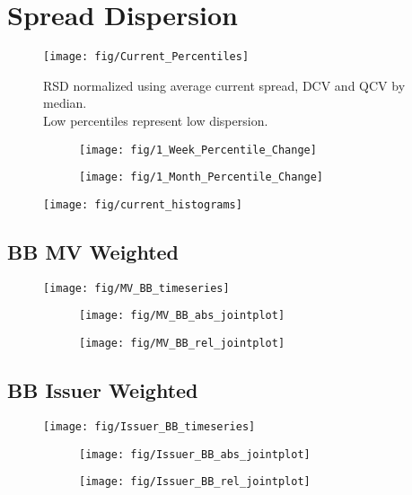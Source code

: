 \documentclass[12pt]{article}
\begin{document}
\section{Spread Dispersion}
\begin{figure}[H]
	\centering
	\texttt{[image: fig/Current\_Percentiles]}
	\caption{RSD normalized using average current spread, DCV and QCV by median.\\ Low percentiles represent low dispersion.}
\end{figure}

\begin{figure}[H]
	\begin{subfigure}[t]{0.48\textwidth}
		\centering
		\texttt{[image: fig/1\_Week\_Percentile\_Change]}
	\end{subfigure}
	\hfill
	\begin{subfigure}[t]{0.48\textwidth}
		\centering
		\texttt{[image: fig/1\_Month\_Percentile\_Change]}
	\end{subfigure}
\end{figure}
\vfill
\begin{figure}[H]
	\centering
	\texttt{[image: fig/current\_histograms]}
\end{figure}
\vfill
\pagebreak


\subsection{BB MV Weighted}
\begin{figure}[H]
	\centering
	\texttt{[image: fig/MV\_BB\_timeseries]}
\end{figure}
\begin{figure}[H]
	\begin{subfigure}[t]{0.48\textwidth}
		\centering
		\texttt{[image: fig/MV\_BB\_abs\_jointplot]}
	\end{subfigure}
	\hfill
	\begin{subfigure}[t]{0.48\textwidth}
		\centering
		\texttt{[image: fig/MV\_BB\_rel\_jointplot]}
	\end{subfigure}
\end{figure}
\pagebreak

\subsection{BB Issuer Weighted}
\begin{figure}[H]
	\centering
	\texttt{[image: fig/Issuer\_BB\_timeseries]}
\end{figure}
\begin{figure}[H]
	\begin{subfigure}[t]{0.48\textwidth}
		\centering
		\texttt{[image: fig/Issuer\_BB\_abs\_jointplot]}
	\end{subfigure}
	\hfill
	\begin{subfigure}[t]{0.48\textwidth}
		\centering
		\texttt{[image: fig/Issuer\_BB\_rel\_jointplot]}
	\end{subfigure}
\end{figure}
\pagebreak
\end{document}
